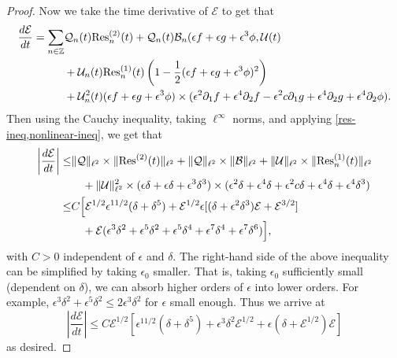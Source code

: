 \begin{proof}
	Now we take the time derivative of \(\mathcal E\) to get that 
	\begin{equation}
	\begin{aligned}
		\frac{d\mathcal E}{dt} = \sum_{n \in \mathbb{Z}} &\mathcal Q_n(t) \mathrm{Res}_n^{(2)}(t) + \mathcal Q_n(t) 	\mathcal B_n(\epsilon f + \epsilon g + \epsilon^3 \phi, \mathcal U(t) \\
		&+ \mathcal U_n(t) \mathrm{Res}_n^{(1)}(t) \left( 1 - \frac 12 (\epsilon f+ \epsilon g + \epsilon^3 \phi)^2  \right) \\
		&+ \mathcal U_n^2(t)(\epsilon f + \epsilon g + \epsilon^3 \phi) \times (\epsilon^2\partial_1 f + \epsilon^4\partial_2 f -\epsilon^2 c \partial_1 g + \epsilon^4 \partial_2 g + \epsilon^4 \partial_2 \phi).
	\end{aligned}
	\end{equation}
	Then using the Cauchy inequality, taking \(\ell^\infty\) norms, and applying \cref{res-ineq,nonlinear-ineq}, we get that
	\begin{equation}
	\begin{aligned}
		\left| \frac{d\mathcal E}{dt} \right| \leq& \| \mathcal Q \|_{\ell^2 }\times \|\mathrm{Res}^{(2)}(t) \|_{\ell^2} + \| \mathcal Q \|_{\ell^2} \times \| \mathcal B \|_{\ell^2}  + \|\mathcal U \|_{\ell^2} \times \| \mathrm{Res}_n^{(1)}(t) \|_{\ell^2}\\
		&\quad + \|\mathcal U \|_{\ell^2}^2 \times  (\epsilon\delta + \epsilon \delta + \epsilon^3 \delta^3)\times (\epsilon^2\delta + \epsilon^4\delta + \epsilon^2 c \delta + \epsilon^4 \delta + \epsilon^4 \delta^3) \\
		\leq& C\Big[\mathcal E^{1/2} \epsilon^{11/2}(\delta + \delta^5) + \mathcal E^{1/2}\epsilon [(\delta + \epsilon^2 \delta^3)\mathcal E + \mathcal E^{3/2}]  \\
		&\quad + \mathcal E(\epsilon^3 \delta^2 + \epsilon^5\delta^2 + \epsilon^5 \delta^4 + \epsilon^7\delta^4 + \epsilon^7 \delta^6) \Big],
	\end{aligned}
	\end{equation}
	with \(C>0\) independent of \(\epsilon\) and \(\delta\). The right-hand side of the above inequality can be simplified by taking \(\epsilon_0\) smaller. That is, taking \(\epsilon_0\) sufficiently small (dependent on \(\delta\)), we can absorb higher orders of \(\epsilon\) into lower orders. For example, \(\epsilon^3 \delta^2 + \epsilon^5\delta^2 \leq 2 \epsilon^3 \delta^2\) for \(\epsilon\) small enough. Thus we arrive at  		
	\begin{equation}
		\left|\frac{d\mathcal E}{dt} \right| \leq C \mathcal E^{1/2}\left[ \epsilon^{11/2} (\delta + \delta^5)  + \epsilon^3\delta^2\mathcal E^{1/2} + \epsilon(\delta + \mathcal{E}^{1/2})\mathcal E\right]
	\end{equation}
	as desired.
\end{proof}



